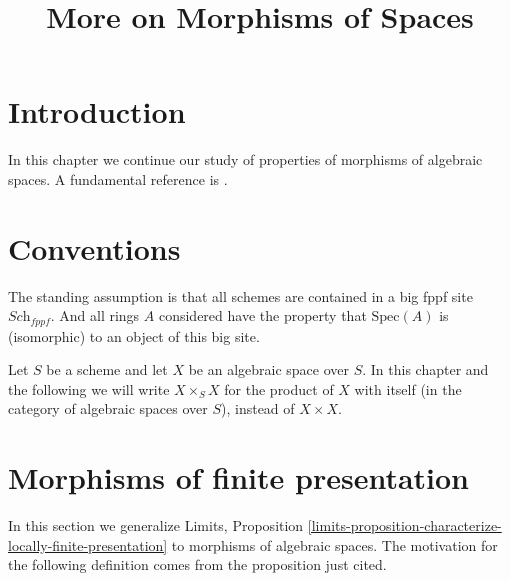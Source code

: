 

%


\title{More on Morphisms of Spaces}


\maketitle

\label{section-phantom}

\tableofcontents

\section{Introduction}
\label{section-introduction}

\noindent
In this chapter we continue our study of properties of morphisms of algebraic
spaces. A fundamental reference is \cite{Kn}.





\section{Conventions}
\label{section-conventions}

\noindent
The standing assumption is that all schemes are contained in
a big fppf site $\textit{Sch}_{fppf}$. And all rings $A$ considered
have the property that $\text{Spec}(A)$ is (isomorphic) to an
object of this big site.

\medskip\noindent
Let $S$ be a scheme and let $X$ be an algebraic space over $S$.
In this chapter and the following we will write $X \times_S X$
for the product of $X$ with itself (in the category of algebraic
spaces over $S$), instead of $X \times X$.




\section{Morphisms of finite presentation}
\label{section-finite-presentation}

\noindent
In this section we generalize
Limits, Proposition
\ref{limits-proposition-characterize-locally-finite-presentation}
to morphisms of algebraic spaces.
The motivation for the following definition comes from
the proposition just cited.

